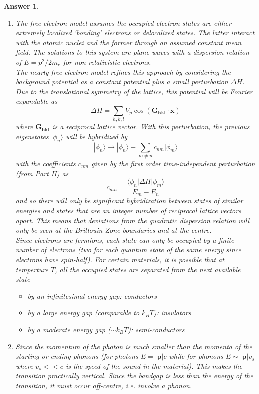 \documentclass[a4paper]{article}
\newtheorem{ans}{Answer}[subsection]
\theoremstyle{new}
\begin{document}
\begin{ans}\leavevmode
\begin{enumerate}[label=(\roman*)]
\item The free electron model assumes the occupied electron states are either extremely localized `bonding' electrons or delocalized states. The latter interact with the atomic nuclei and the former through an assumed constant mean field. The solutions to this system are plane waves with a dispersion relation of $E=p^2/2m_e$ for non-relativistic electrons.\\[5pt]
The nearly free electron model refines this approach by considering the background potential as a constant potential plus a small perturbation $\Delta H$. Due to the translational symmetry of the lattice, this potential will be Fourier expandable as
$$\Delta H=\sum_{h,k,l}V_p\cos(\mathbf{G_{hkl}}\cdot\mathbf{x})$$
where $\mathbf{G_{hkl}}$ is a reciprocal lattice vector. With this perturbation, the previous eigenstates $|\phi_n\rangle$ will be hybridized by
$$|\phi_n\rangle\rightarrow|\phi_n\rangle+\sum_{m\neq n}c_{nm}|\phi_m\rangle$$
with the coefficients $c_{nm}$ given by the first order time-independent perturbation (from Part II) as
$$c_{mn}=\frac{\langle\phi_n|\Delta H|\phi_m\rangle}{E_m-E_n}$$
and so there will only be significant hybridization between states of similar energies and states that are an integer number of reciprocal lattice vectors apart. This means that deviations from the quadratic dispersion relation will only be seen at the Brillouin Zone boundaries and at the centre.\\[5pt]
Since electrons are fermions, each state can only be occupied by a finite number of electrons (two for each quantum state of the same energy since electrons have spin-half). For certain materials, it is possible that at temperture $T$, all the occupied states are separated from the next available state
\begin{itemize}
    \item by an infinitesimal energy gap: conductors
    \item by a large energy gap (comparable to $k_BT$): insulators
    \item by a moderate energy gap ($\sim k_BT$): semi-conductors
\end{itemize}
\item Since the momentum of the photon is much smaller than the momenta of the starting or ending phonons (for photons $E=|\mathbf{p}|c$ while for phonons $E\sim|\mathbf{p}|v_s$ where $v_s<<c$ is the speed of the sound in the material). This makes the transition practically vertical. Since the bandgap is less than the energy of the transition, it must occur off-centre, i.e. involve a phonon.

\end{enumerate}
\end{ans}
\end{document}
